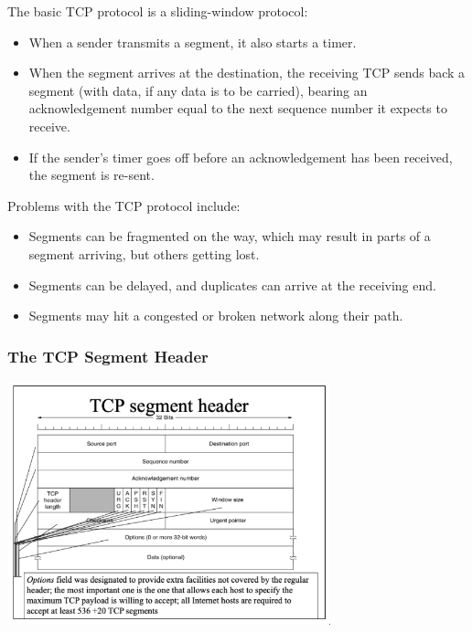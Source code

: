 \documentclass[11pt]{article}
\begin{document}
The basic TCP protocol is a sliding-window protocol:
\begin{itemize}
    \item   When a sender transmits a segment, it also starts a timer.
    \item   When the segment arrives at the destination, the receiving TCP sends back a segment (with data, if any data is to be carried), bearing an acknowledgement number equal to the next sequence number 
            it expects to receive.
    \item   If the sender's timer goes off before an acknowledgement has been received, the segment is re-sent.
\end{itemize}

Problems with the TCP protocol include:
\begin{itemize}
    \item   Segments can be fragmented on the way, which may result in parts of a segment arriving, but others getting lost.
    \item   Segments can be delayed, and duplicates can arrive at the receiving end.
    \item   Segments may hit a congested or broken network along their path.
\end{itemize}

\subsubsection{The TCP Segment Header}
\begin{center}
    \includegraphics[width=0.7\textwidth]{tcpsegmengtheader.png}
\end{center}
\end{document}
